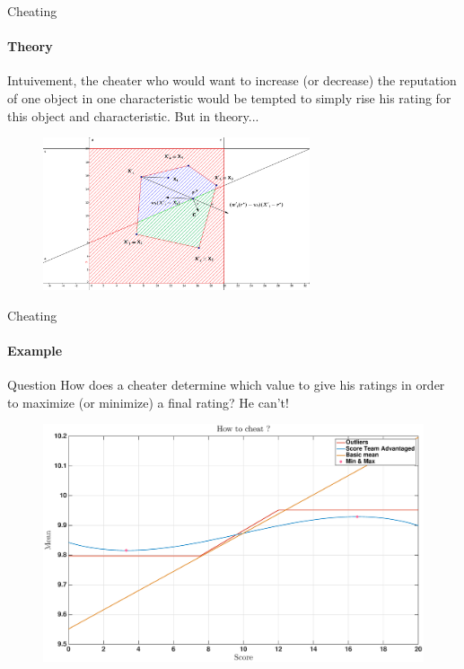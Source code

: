 
\begin{frame}{Cheating}
\framesubtitle{Theory}

        Intuivement, the cheater who would want to increase (or decrease) the reputation of one object in one characteristic would be tempted to simply rise his rating for this object and characteristic. But in theory...
        
        \begin{figure}
            \centering
            \includegraphics[width=0.7\textwidth]{../rapport/images/geogebra/Hyperplane.png}
        \end{figure}
        
\end{frame}

\begin{frame}{Cheating}
\framesubtitle{Example}
        \begin{exampleblock}{Question}
            How does a cheater determine which value to give his ratings in order to maximize (or minimize) a final rating? He can't!
        \end{exampleblock}
        
        \begin{figure}
            \centering
            \includegraphics[width=\textwidth]{../rapport/images/cheaters/howto.eps}
        \end{figure}
\end{frame}

